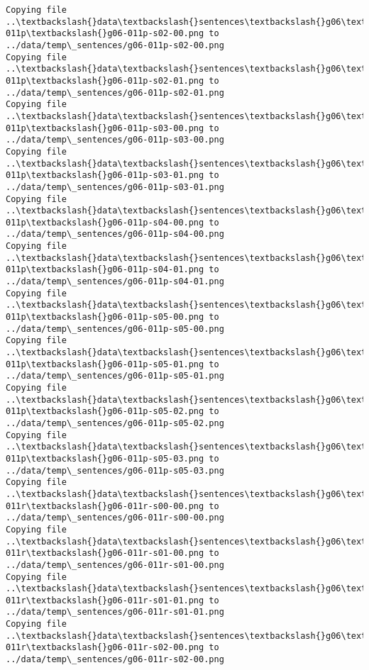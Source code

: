 \documentclass[11pt]{article}
\begin{document}
\begin{Verbatim}[commandchars=\\\{\}]
Copying file ..\textbackslash{}data\textbackslash{}sentences\textbackslash{}g06\textbackslash{}g06-011p\textbackslash{}g06-011p-s02-00.png to
../data/temp\_sentences/g06-011p-s02-00.png
Copying file ..\textbackslash{}data\textbackslash{}sentences\textbackslash{}g06\textbackslash{}g06-011p\textbackslash{}g06-011p-s02-01.png to
../data/temp\_sentences/g06-011p-s02-01.png
Copying file ..\textbackslash{}data\textbackslash{}sentences\textbackslash{}g06\textbackslash{}g06-011p\textbackslash{}g06-011p-s03-00.png to
../data/temp\_sentences/g06-011p-s03-00.png
Copying file ..\textbackslash{}data\textbackslash{}sentences\textbackslash{}g06\textbackslash{}g06-011p\textbackslash{}g06-011p-s03-01.png to
../data/temp\_sentences/g06-011p-s03-01.png
Copying file ..\textbackslash{}data\textbackslash{}sentences\textbackslash{}g06\textbackslash{}g06-011p\textbackslash{}g06-011p-s04-00.png to
../data/temp\_sentences/g06-011p-s04-00.png
Copying file ..\textbackslash{}data\textbackslash{}sentences\textbackslash{}g06\textbackslash{}g06-011p\textbackslash{}g06-011p-s04-01.png to
../data/temp\_sentences/g06-011p-s04-01.png
Copying file ..\textbackslash{}data\textbackslash{}sentences\textbackslash{}g06\textbackslash{}g06-011p\textbackslash{}g06-011p-s05-00.png to
../data/temp\_sentences/g06-011p-s05-00.png
Copying file ..\textbackslash{}data\textbackslash{}sentences\textbackslash{}g06\textbackslash{}g06-011p\textbackslash{}g06-011p-s05-01.png to
../data/temp\_sentences/g06-011p-s05-01.png
Copying file ..\textbackslash{}data\textbackslash{}sentences\textbackslash{}g06\textbackslash{}g06-011p\textbackslash{}g06-011p-s05-02.png to
../data/temp\_sentences/g06-011p-s05-02.png
Copying file ..\textbackslash{}data\textbackslash{}sentences\textbackslash{}g06\textbackslash{}g06-011p\textbackslash{}g06-011p-s05-03.png to
../data/temp\_sentences/g06-011p-s05-03.png
Copying file ..\textbackslash{}data\textbackslash{}sentences\textbackslash{}g06\textbackslash{}g06-011r\textbackslash{}g06-011r-s00-00.png to
../data/temp\_sentences/g06-011r-s00-00.png
Copying file ..\textbackslash{}data\textbackslash{}sentences\textbackslash{}g06\textbackslash{}g06-011r\textbackslash{}g06-011r-s01-00.png to
../data/temp\_sentences/g06-011r-s01-00.png
Copying file ..\textbackslash{}data\textbackslash{}sentences\textbackslash{}g06\textbackslash{}g06-011r\textbackslash{}g06-011r-s01-01.png to
../data/temp\_sentences/g06-011r-s01-01.png
Copying file ..\textbackslash{}data\textbackslash{}sentences\textbackslash{}g06\textbackslash{}g06-011r\textbackslash{}g06-011r-s02-00.png to
../data/temp\_sentences/g06-011r-s02-00.png

\end{Verbatim}
\end{document}

